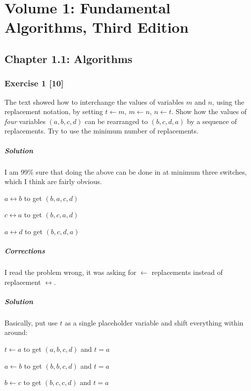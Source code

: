 \documentclass{report}
\begin{document}
	
\chapter*{Volume 1: Fundamental Algorithms, Third Edition}

	\section*{Chapter 1.1: Algorithms}
	
		\subsection*{Exercise 1 [10]} 
		
			The text showed how to interchange the values of variables $m$ and $n$, using the replacement notation, by setting $t \leftarrow m$, $m \leftarrow n$, $n \leftarrow t$. Show how the values of \textit{four} variables $(a,b,c,d)$ can be rearranged to $(b,c,d,a)$ by a sequence of replacements. Try to use the minimum number of replacements.
			
			\paragraph{Solution} I am 99\% sure that doing the above can be done in at minimum three switches, which I think are fairly obvious. 
			
			$a \leftrightarrow b$ to get $(b,a,c,d)$
			
			$c \leftrightarrow a$ to get $(b,c,a,d)$
			
			$a \leftrightarrow d$ to get $(b,c,d,a)$
			
			\paragraph{Corrections} I read the problem wrong, it was asking for $\leftarrow$ replacements instead of replacement $\leftrightarrow$.
			
			\paragraph{Solution} Basically, put use $t$ as a single placeholder variable and shift everything within around:
			
			$t \leftarrow a$ to get $(a,b,c,d)$ and $t=a$
			
			$a \leftarrow b$ to get $(b,b,c,d)$ and $t=a$
			
			$b \leftarrow c$ to get $(b,c,c,d)$ and $t=a$
			
\end{document}
